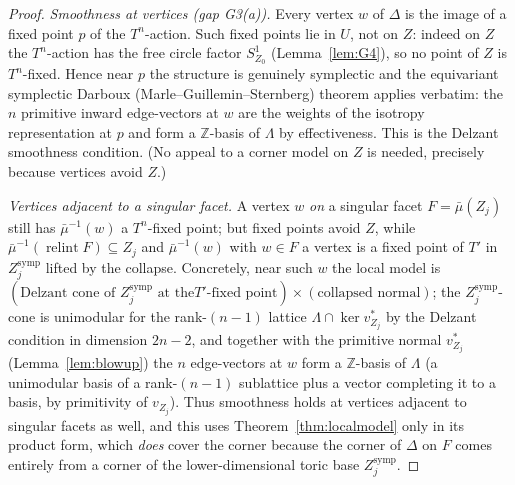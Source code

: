 \documentclass{amsart}
\theoremstyle{definition}
\begin{document}
\begin{proof}
\emph{Smoothness at vertices (gap G3(a)).} Every vertex $w$ of $\Delta$ is the
image of a fixed point $p$ of the $T^n$-action. Such fixed points lie in $U$,
not on $Z$: indeed on $Z$ the $T^n$-action has the free circle factor
$S^1_{Z_0}$ (Lemma~\ref{lem:G4}), so no point of $Z$ is $T^n$-fixed. Hence near
$p$ the structure is genuinely symplectic and the equivariant symplectic Darboux
(Marle--Guillemin--Sternberg) theorem applies verbatim: the $n$ primitive inward
edge-vectors at $w$ are the weights of the isotropy representation at $p$ and
form a $\mathbb Z$-basis of $\Lambda$ by effectiveness. This is the Delzant
smoothness condition. (No appeal to a corner model on $Z$ is needed, precisely
because vertices avoid $Z$.)

\emph{Vertices adjacent to a singular facet.} A vertex $w$ \emph{on} a singular
facet $F=\bar\mu(Z_j)$ still has $\bar\mu^{-1}(w)$ a $T^n$-fixed point; but
fixed points avoid $Z$, while $\bar\mu^{-1}(\operatorname{relint}F)\subseteq Z_j$
and $\bar\mu^{-1}(w)$ with $w\in F$ a vertex is a fixed point of $T'$ in
$Z_j^{\mathrm{symp}}$ lifted by the collapse. Concretely, near such $w$ the
local model is $(\text{Delzant cone of }Z_j^{\mathrm{symp}}\text{ at the
}T'\text{-fixed point})\times(\text{collapsed normal})$; the
$Z_j^{\mathrm{symp}}$-cone is unimodular for the rank-$(n-1)$ lattice
$\Lambda\cap\ker v^*_{Z_j}$ by the Delzant condition in dimension $2n-2$, and
together with the primitive normal $v^*_{Z_j}$ (Lemma~\ref{lem:blowup}) the $n$
edge-vectors at $w$ form a $\mathbb Z$-basis of $\Lambda$ (a unimodular basis of
a rank-$(n-1)$ sublattice plus a vector completing it to a basis, by primitivity
of $v_{Z_j}$). Thus smoothness holds at vertices adjacent to singular facets as
well, and this uses Theorem~\ref{thm:localmodel} only in its product form,
which \emph{does} cover the corner because the corner of $\Delta$ on $F$ comes
entirely from a corner of the lower-dimensional toric base
$Z_j^{\mathrm{symp}}$.


\end{proof}
\end{document}
